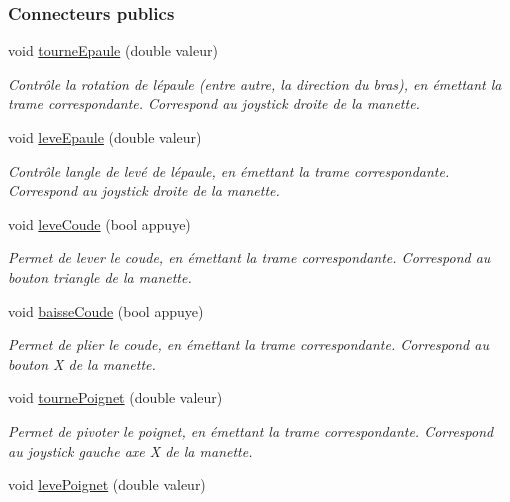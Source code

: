 \subsubsection*{Connecteurs publics}
\begin{DoxyCompactItemize}
\item 
void \hyperlink{class_bras_aaeacb18f22532a63559fc8430118169e}{tourne\+Epaule} (double valeur)
\begin{DoxyCompactList}\small\item\em Contrôle la rotation de l\textquotesingle{}épaule (entre autre, la direction du bras), en émettant la trame correspondante. Correspond au joystick droite de la manette. \end{DoxyCompactList}\item 
void \hyperlink{class_bras_ac8f658db87d03bfbba6faa535326cc3a}{leve\+Epaule} (double valeur)
\begin{DoxyCompactList}\small\item\em Contrôle l\textquotesingle{}angle de levé de l\textquotesingle{}épaule, en émettant la trame correspondante. Correspond au joystick droite de la manette. \end{DoxyCompactList}\item 
void \hyperlink{class_bras_a197686a4ff55b4fe2384b2af44b8228b}{leve\+Coude} (bool appuye)
\begin{DoxyCompactList}\small\item\em Permet de lever le coude, en émettant la trame correspondante. Correspond au bouton triangle de la manette. \end{DoxyCompactList}\item 
void \hyperlink{class_bras_a4b8e4791a454fcf884b1e7217a16a326}{baisse\+Coude} (bool appuye)
\begin{DoxyCompactList}\small\item\em Permet de plier le coude, en émettant la trame correspondante. Correspond au bouton X de la manette. \end{DoxyCompactList}\item 
void \hyperlink{class_bras_a15beae8aa104c2e689614486646ab402}{tourne\+Poignet} (double valeur)
\begin{DoxyCompactList}\small\item\em Permet de pivoter le poignet, en émettant la trame correspondante. Correspond au joystick gauche axe X de la manette. \end{DoxyCompactList}\item 
void \hyperlink{class_bras_ac95f54d8b02e7c88081f482fbbc40aef}{leve\+Poignet} (double valeur)

\end{DoxyCompactItemize}
